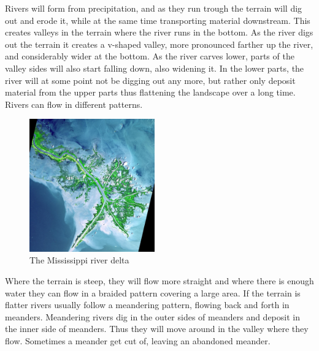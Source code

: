 \documentclass[a4paper,12pt]{report}
\begin{document}
Rivers will form from precipitation, and as they run trough the terrain will dig out and erode it, while at the same time transporting material downstream. This creates valleys in the terrain where the river runs in the bottom. As the river digs out the terrain it creates a v-shaped valley, more pronounced farther up the river, and considerably wider at the bottom. As the river carves lower, parts of the valley sides will also start falling down, also widening it. In the lower parts, the river will at some point not be digging out any more, but rather only deposit material from the upper parts thus flattening the landscape over a long time. Rivers can flow in different patterns.
\begin{figure}
  \begin{center}
   \vspace{-15pt}
    \includegraphics[width=0.48\textwidth]{thesis/geo/miss.jpg}
  \end{center}
   \vspace{-15pt}
  \caption{The Mississippi river delta}
   \vspace{10pt}
  \label{fig:miss}
\end{figure}
Where the terrain is steep, they will flow more straight and where there is enough water they can flow in a braided pattern covering a large area. If the terrain is flatter rivers usually follow a meandering pattern, flowing back and forth in meanders. Meandering rivers dig in the outer sides of meanders and deposit in the inner side of meanders. Thus they will move around in the valley where they flow. Sometimes a meander get cut of, leaving an abandoned meander. 
\end{document}
